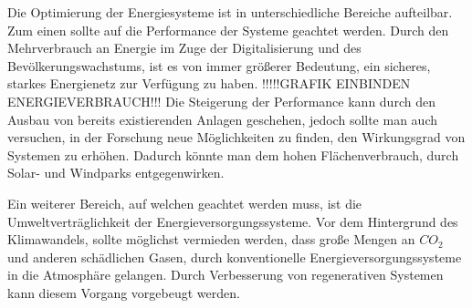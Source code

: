 Die Optimierung der Energiesysteme ist in unterschiedliche Bereiche aufteilbar.
Zum einen sollte auf die Performance der Systeme geachtet werden. Durch den
Mehrverbrauch an Energie im Zuge der Digitalisierung und des
Bevölkerungswachstums, ist es von immer größerer Bedeutung, ein sicheres,
starkes Energienetz zur Verfügung zu haben. !!!!!GRAFIK EINBINDEN
ENERGIEVERBRAUCH!!! Die Steigerung der Performance kann durch den Ausbau von
bereits existierenden Anlagen geschehen, jedoch sollte man auch versuchen, in
der Forschung neue Möglichkeiten zu finden, den Wirkungsgrad von Systemen zu
erhöhen. Dadurch könnte man dem hohen Flächenverbrauch, durch Solar- und
Windparks entgegenwirken.

Ein weiterer Bereich, auf welchen geachtet werden muss, ist die
Umweltverträglichkeit der Energieversorgungssysteme. Vor dem Hintergrund des
Klimawandels, sollte möglichst vermieden werden, dass große Mengen an $CO_2$ und
anderen schädlichen Gasen, durch konventionelle Energieversorgungssysteme in die Atmosphäre
gelangen. Durch Verbesserung von regenerativen Systemen kann diesem Vorgang vorgebeugt werden.\\